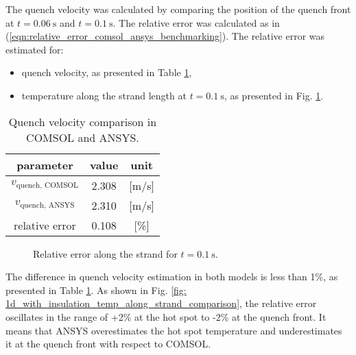 The quench velocity was calculated by comparing the position of the quench front at $t=0.06~\text{s}$ and $t=0.1~\text{s}$. The relative error was calculated as in (\ref{eqn:relative_error_comsol_ansys_benchmarking}). The relative error was estimated for: 
\begin{itemize}
    \item quench velocity, as presented in Table \ref{table: 1d_with_insulation_v_quench_comparison},
    \item temperature along the strand length at $t=0.1~\text{s}$, as presented in Fig. \ref{fig: ans_comsol_comparison_f_2_2_with_insulation}.
\end{itemize}

\begin{table}[H]
    \caption{Quench velocity comparison in COMSOL and ANSYS.} 
    \vspace{-1.em} 
    \fontsize{10}{10}
    \selectfont 
    \renewcommand{\arraystretch}{1.5}
    \begin{center}
        \begin{tabular}{ ccc }  
        \hline
        parameter & value & unit \\
        \hline
        $v_\text{quench, COMSOL}$ & 2.308 & [m/s] \\
        $v_\text{quench, ANSYS}$ & 2.310 & [m/s] \\
        relative error & 0.108 & [\%] \\
        \hline 
        \end{tabular}
    \end{center}  
     \label{table: 1d_with_insulation_v_quench_comparison} 
 \end{table}

\begin{figure}[H]
\centering
    \caption{Relative error along the strand for $t=0.1~\text{s}$.}
    \label{fig: ans_comsol_comparison_f_2_2_with_insulation}
\end{figure}

The difference in quench velocity estimation in both models is less than 1\%, as presented in Table \ref{table: 1d_with_insulation_v_quench_comparison}. As shown in Fig. \ref{fig: 1d_with_insulation_temp_along_strand_comparison}, the relative error oscillates in the range of +2\% at the hot spot to -2\% at the quench front. It means that ANSYS overestimates the hot spot temperature and underestimates it at the quench front with respect to COMSOL.

